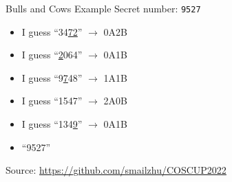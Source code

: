 \documentclass[10pt]{beamer}
\begin{document}
\begin{frame}{Bulls and Cows Example}
Secret number: \texttt{9527}
\begin{itemize}[<+(1)->]
    \item I guess ``34\underline{72}'' $\rightarrow$ 0A2B
    \item I guess ``\underline{2}064'' $\rightarrow$ 0A1B
    \item I guess ``\alert{9}\underline{7}48'' $\rightarrow$ 1A1B
    \item I guess ``1\alert{5}4\alert{7}'' $\rightarrow$ 2A0B
    \item I guess ``134\underline{9}'' $\rightarrow$ 0A1B
    \item ``9527''
\end{itemize}

Source: \url{https://github.com/smailzhu/COSCUP2022}


\end{frame}

\end{document}
